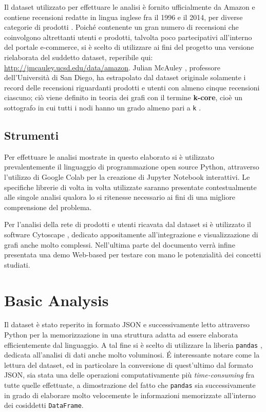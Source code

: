 \documentclass[hidelinks, 12pt]{article}
\begin{document}
Il dataset utilizzato per effettuare le analisi è fornito ufficialmente da Amazon e contiene recensioni redatte in lingua inglese fra il 1996 e il 2014, per diverse categorie di prodotti \cite{site:amazon-reviews-original-dataset}. Poiché contenente un gran numero di recensioni che coinvolgono altrettanti utenti e prodotti, talvolta poco partecipativi all'interno del portale e-commerce, si è scelto di utilizzare ai fini del progetto una versione rielaborata del suddetto dataset, reperibile qui: \url{http://jmcauley.ucsd.edu/data/amazon}. Julian McAuley \cite{site:julianmcauley}, professore dell'Università di San Diego, ha estrapolato dal dataset originale solamente i record delle recensioni riguardanti prodotti e utenti con almeno cinque recensioni ciascuno; ciò viene definito in teoria dei grafi con il termine \textbf{k-core}, cioè un sottografo in cui tutti i nodi hanno un grado almeno pari a \texttt{k} \cite{site:wiki-kcore}.

\nocite{site:amazon-reviews-5-core-dataset}



\subsection{Strumenti}

Per effettuare le analisi mostrate in questo elaborato si è utilizzato prevalentemente il linguaggio di programmazione open source Python, attraverso l'utilizzo di Google Colab \cite{site:google-colab} per la creazione di Jupyter Notebook interattivi. Le specifiche librerie di volta in volta utilizzate saranno presentate contestualmente alle singole analisi qualora lo si ritenesse necessario ai fini di una migliore comprensione del problema.

Per l'analisi della rete di prodotti e utenti ricavata dal dataset si è utilizzato il software Cytoscape \cite{site:cytoscape}, dedicato appositamente all'integrazione e visualizzazione di grafi anche molto complessi. Nell'ultima parte del documento verrà infine presentata una demo Web-based per testare con mano le potenzialità dei concetti studiati.



\clearpage



\section{Basic Analysis}


Il dataset è stato reperito in formato JSON e successivamente letto attraverso Python per la memorizzazione in una struttura adatta ad essere elaborata efficientemente dal linguaggio. A tal fine si è scelto di utilizzare la liberia \texttt{pandas} \cite{site:pandas}, dedicata all'analisi di dati anche molto voluminosi. É interessante notare come la lettura del dataset, ed in particolare la conversione di quest'ultimo dal formato JSON, sia stata una delle operazioni computativamente più \textit{time-consuming} fra tutte quelle effettuate, a dimostrazione del fatto che \texttt{pandas} sia successivamente in grado di elaborare molto velocemente le informazioni memorizzate all'interno dei cosiddetti \texttt{DataFrame}.
\end{document}
